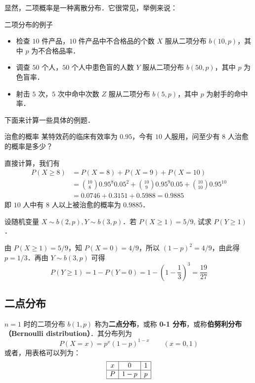 显然，二项概率是一种离散分布．它很常见，举例来说：
\begin{example}{二项分布的例子}
\begin{itemize}
\item 检查 $10$ 件产品，$ 10 $ 件产品中不合格品的个数 $X $ 服从二项分布 $b(10,p)$，其中 $p$ 为不合格品率．
\item 调查 $50 $ 个人，$ 50 $ 个人中患色盲的人数 $Y $ 服从二项分布 $b(50,p)$，其中 $p$ 为色盲率．
\item 射击 $5 $ 次，$ 5 $ 次中命中次数 $Z $ 服从二项分布 $b(5,p)$，其中 $p $ 为射手的命中率．
\end{itemize}
\end{example}

下面来计算一些具体的例题．
\begin{example}{治愈的概率}
某特效药的临床有效率为 $0. 95$，今有 $10 $ 人服用，问至少有 $8 $ 人治愈的概率是多少？

直接计算，我们有
\begin{equation}
\begin{aligned} P(X \geqslant 8) &=P(X=8)+P(X=9)+P(X=10) \\ &=\binom{10}{8} 0.95^{8} 0.05^{2}+\binom{10}{9} 0.95^{9} 0.05+\binom{10}{10} 0.95^{10} \\ &=0.0746+0.3151+0.5988=0.9885 \end{aligned}
\end{equation}
即 $10 $ 人中有 $8 $ 人以上被治愈的概率为 $0. 988 5$．
\end{example}

\begin{example}{}
设随机变量 $X\sim b(2,p),Y\sim b(3,p)$．若 $P (X\geqslant1) = 5/9$, 试求 $P(Y\geqslant1)$．

由 $P(X\geqslant1)=5/9$，知 $P(X=0)=4/9$，所以 $(1-p)^2=4/9$，由此得 $p=1/3$．再由 $Y\sim b(3,p)$ 可得
\begin{equation}
P(Y \geqslant 1)=1-P(Y=0)=1-\left(1-\frac{1}{3}\right)^{3}=\frac{19}{27}
\end{equation}
\end{example}

\subsection{二点分布}
$n=1$ 时的二项分布 $b (1 ,p)$ 称为\textbf{二点分布}，或称 \textbf{0-1 分布}，或称\textbf{伯努利分布（Bernoulli distribution）}．其分布列为
\begin{equation}
P(X=x)=p^{x}(1-p)^{1-x} \qquad (x=0,1)
\end{equation}
或者，用表格可以列为：
\begin{equation}
\begin{array}{|c|c|c|}\hline x & 0 & 1 \\ \hline P & 1-p & p \\ \hline  \end{array}
\end{equation}

